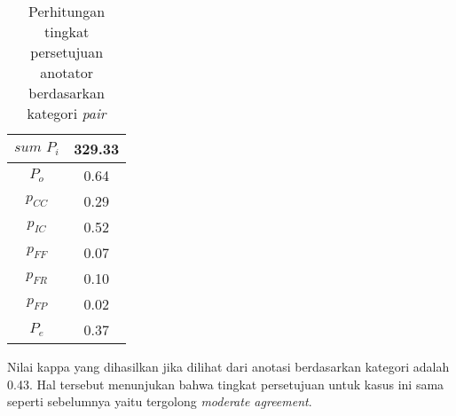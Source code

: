 \begin{table}
  \centering
  \caption{Perhitungan tingkat persetujuan anotator berdasarkan kategori \textit{pair}}
  \label{table:pair-kappa2}
  \begin{tabular}{|c|c|}
  \hline
  $sum\,\,P_i$ & 329.33 \\ \hline
  $P_o$ & 0.64 \\ \hline
  $p_{CC}$ & 0.29 \\ \hline
  $p_{IC}$ & 0.52 \\ \hline
  $p_{FF}$ & 0.07 \\ \hline
  $p_{FR}$ & 0.10 \\ \hline
  $p_{FP}$ & 0.02 \\ \hline
  $P_e$ & 0.37 \\ \hline
  \end{tabular} 
\end{table}

\noindent Nilai kappa yang dihasilkan jika dilihat dari anotasi berdasarkan kategori adalah 0.43. Hal tersebut menunjukan bahwa tingkat persetujuan untuk kasus ini sama seperti sebelumnya yaitu tergolong \textit{moderate agreement}.

